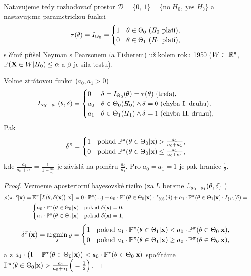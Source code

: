 Natavujeme tedy rozhodovací prostor $\mathscr{D}=\{0,~1\}=\{\text{no }H_0,~\text{yes }H_0\}$ a nastavujeme parametrickou funkci
$$ \tau(\theta)=I_{\Theta_0}=\begin{cases}
1& \theta\in\Theta_0~(H_0\text{ platí}),\\0& \theta\in\Theta_1~(H_1\text{ platí}),
\end{cases}$$ s čímž přišel Neyman s Pearsonem (a Fisherem) už kolem roku 1950 ($W\subset\mathbb{R}^n$, $\mathbb{P}(\textbf{X}\in W|H_0)\leq \alpha$ a $\beta$ je síla testu).
\begin{theorem}
	Volme ztrátovou funkci ($a_0,a_1>0$) $$L_{a_0-a_1}(\theta,\delta)=\begin{cases}
	0&\delta=I_{\Theta_0}(\theta)=\tau(\theta)~(\text{trefa}),\\a_0& \theta\in\Theta_0(H_0)\wedge \delta=0~(\text{chyba I. druhu}),\\a_1& \theta\in\Theta_1(H_1)\wedge \delta=1~(\text{chyba II. druhu}),
	\end{cases}$$
	Pak $$\delta^\pi=\begin{cases}
	1& \text{pokud }\mathbb{P}^\pi(\theta\in\Theta_0|\textbf{x})>\frac{a_1}{a_0+a_1},\\
	0& \text{pokud }\mathbb{P}^\pi(\theta\in\Theta_0|\textbf{x})\leq\frac{a_1}{a_0+a_1},
	\end{cases}$$ kde $\frac{a_1}{a_0+a_1}=\frac{1}{1+\frac{a_0}{a_1}}$ je závislá na poměru $\frac{a_0}{a_1}$. Pro $a_0=a_1=1$ je pak hranice $\frac{1}{2}$.
	\begin{proof}
		Vezmeme aposteriorní bayesovské riziko (za $L$ bereme $L_{a_0-a_1}(\theta,\delta)$ )
		\[
		\begin{split}
		\varrho(\pi,\delta|\textbf{x})&=\mathbb{E}^\pi\big[L\big(\theta,\delta(\textbf{x})\big)\big| \textbf{x}\big]=0\cdot\mathbb{P}^{\pi}(...)+a_0\cdot \mathbb{P}^\pi(\theta\in\Theta_0|\textbf{x})\cdot I_{\{0\}}(\delta)+a_1 \cdot\mathbb{P}^\pi (\theta\in\Theta_1|\textbf{x})\cdot I_{\{1\}}(\delta)=\\&=\begin{cases}
		a_0\cdot \mathbb{P}^\pi(\theta\in\Theta_0|\textbf{x})&\text{pokud }\delta(\textbf{x})=0,\\
		a_1\cdot \mathbb{P}^\pi(\theta\in\Theta_1|\textbf{x})&\text{pokud }\delta(\textbf{x})=1,
		\end{cases}
		\end{split}
		\] 		
		$$ \delta^\pi(\textbf{x})=\mathop{\mathrm{argmin}}_\delta \varrho=\begin{cases}
		1&\text{pokud }a_1\cdot\mathbb{P}^\pi(\theta\in\Theta_1|\textbf{x})<a_0\cdot\mathbb{P}^\pi(\theta\in\Theta_0|\textbf{x}),\\
		0&\text{pokud }a_1\cdot\mathbb{P}^\pi(\theta\in\Theta_1|\textbf{x})\geq a_0\cdot\mathbb{P}^\pi(\theta\in\Theta_0|\textbf{x}),\\
		\end{cases} $$
		a z $a_1\cdot\big(1-\mathbb{P}^\pi(\theta\in\Theta_0|\textbf{x})\big)<a_0\cdot\mathbb{P}^\pi(\theta\in\Theta_0|\textbf{x})$ spočítáme $\mathbb{P}^\pi(\theta\in\Theta_0|\textbf{x})>\frac{a_1}{a_0+a_1}\Big(=\frac{1}{2}\Big)$.
	\end{proof}
\end{theorem}
